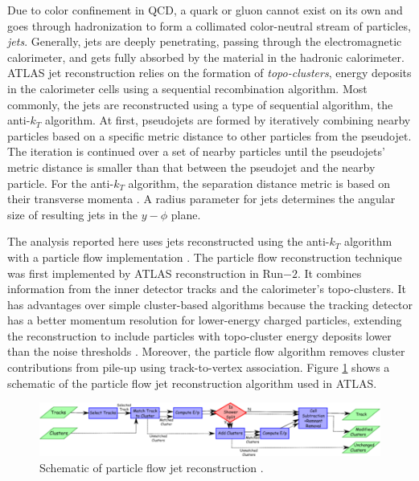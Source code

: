 Due to color confinement in QCD, a quark or gluon cannot exist on its own and goes through hadronization to form a collimated color-neutral stream of particles, \textit{jets}. Generally, jets are deeply penetrating, passing through the electromagnetic calorimeter, and gets fully absorbed by the material in the hadronic calorimeter. ATLAS jet reconstruction relies on the formation of \textit{topo-clusters}, energy deposits in the calorimeter cells using a sequential recombination algorithm. Most commonly, the jets are reconstructed using a type of sequential algorithm, the anti-$k_{T}$ algorithm. At first, pseudojets are formed by iteratively combining nearby particles based on a specific metric distance to other particles from the pseudojet. The iteration is continued over a set of nearby particles until the pseudojets' metric distance is smaller than that between the pseudojet and the nearby particle. For the anti-$k_{T}$ algorithm, the separation distance metric is based on their transverse momenta \cite{AntiKtAlgo}. A radius parameter for jets determines the angular size of resulting jets in the $y-\phi$ plane. 

The analysis reported here uses jets reconstructed using the anti-$k_{T}$ algorithm with a particle flow implementation \cite{ParticleFlow}\cite{AntiKtAlgo}. The particle flow reconstruction technique was first implemented by ATLAS reconstruction in Run$-2$. It combines information from the inner detector tracks and the calorimeter's topo-clusters. It has advantages over simple cluster-based algorithms because the tracking detector has a better momentum resolution for lower-energy charged particles, extending the reconstruction to include particles with topo-cluster energy deposits lower than the noise thresholds \cite{ParticleFlow}. Moreover, the particle flow algorithm removes cluster contributions from pile-up using track-to-vertex association. Figure \ref{fig:PflowJets} shows a schematic of the particle flow jet reconstruction algorithm used in ATLAS.

\begin{figure}
    \centering
    \includegraphics[width=.95\linewidth]{figures/LHC/PflowAlg.pdf}
    \caption{ Schematic of particle flow jet reconstruction \cite{ParticleFlow}.\label{fig:PflowJets}}
\end{figure}


